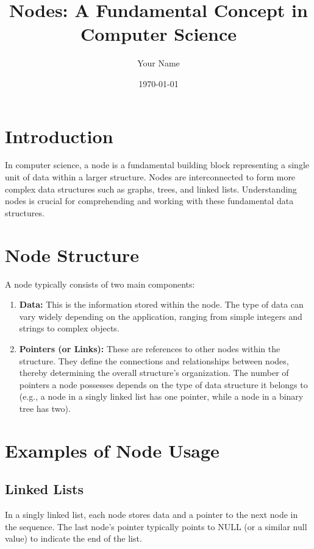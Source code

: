 \documentclass{article}
\title{Nodes: A Fundamental Concept in Computer Science}
\author{Your Name}
\date{\today}
\begin{document}
\maketitle

\section{Introduction}

In computer science, a node is a fundamental building block representing a single unit of data within a larger structure.  Nodes are interconnected to form more complex data structures such as graphs, trees, and linked lists.  Understanding nodes is crucial for comprehending and working with these fundamental data structures.

\section{Node Structure}

A node typically consists of two main components:

\begin{enumerate}
    \item \textbf{Data:} This is the information stored within the node. The type of data can vary widely depending on the application, ranging from simple integers and strings to complex objects.
    \item \textbf{Pointers (or Links):} These are references to other nodes within the structure.  They define the connections and relationships between nodes, thereby determining the overall structure's organization.  The number of pointers a node possesses depends on the type of data structure it belongs to (e.g., a node in a singly linked list has one pointer, while a node in a binary tree has two).
\end{enumerate}

\section{Examples of Node Usage}

\subsection{Linked Lists}

In a singly linked list, each node stores data and a pointer to the next node in the sequence.  The last node's pointer typically points to NULL (or a similar null value) to indicate the end of the list.
\end{document}
